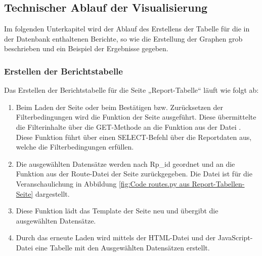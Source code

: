 \subsection{Technischer Ablauf der Visualisierung}
\label{subsec:technische-details-zur-visualisierung}


Im folgenden Unterkapitel wird der Ablauf des Erstellens der Tabelle für die in der Datenbank enthaltenen Berichte, so wie die
Erstellung der Graphen grob beschrieben und ein Beispiel der Ergebnisse gegeben.

\subsubsection{Erstellen der Berichtstabelle}

Das Erstellen der Berichtstabelle für die Seite „Report-Tabelle“ läuft wie folgt ab:

\begin{enumerate}

    \item Beim Laden der Seite oder beim Bestätigen bzw. Zurücksetzen der Filterbedingungen wird die Funktion  der Seite ausgeführt.
    Diese übermittelte die Filterinhalte über die GET-Methode an die Funktion  aus der Datei .
    Diese Funktion führt über  einen SELECT-Befehl über die Reportdaten aus, welche die Filterbedingungen erfüllen.
    \item Die ausgewählten Datensätze werden nach Rp\_id geordnet und an die Funktion  aus der Route-Datei der Seite zurückgegeben.
    Die Datei  ist für die Veranschaulichung in Abbildung \ref{fig:Code routes.py aus Report-Tabellen-Seite} dargestellt.
    \item Diese Funktion lädt das Template der Seite neu und übergibt die ausgewählten Datensätze.
    \item Durch das erneute Laden wird mittels der HTML-Datei  und der JavaScript-Datei  eine Tabelle mit den
    Ausgewählten Datensätzen erstellt.

\end{enumerate}

